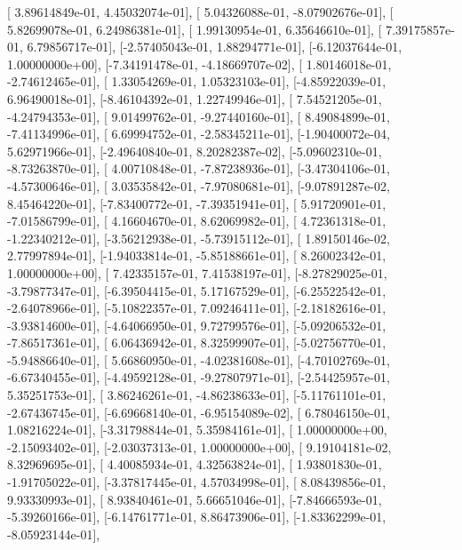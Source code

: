 \documentclass{article}
\begin{document}
       [ 3.89614849e-01,  4.45032074e-01],
       [ 5.04326088e-01, -8.07902676e-01],
       [ 5.82699078e-01,  6.24986381e-01],
       [ 1.99130954e-01,  6.35646610e-01],
       [ 7.39175857e-01,  6.79856717e-01],
       [-2.57405043e-01,  1.88294771e-01],
       [-6.12037644e-01,  1.00000000e+00],
       [-7.34191478e-01, -4.18669707e-02],
       [ 1.80146018e-01, -2.74612465e-01],
       [ 1.33054269e-01,  1.05323103e-01],
       [-4.85922039e-01,  6.96490018e-01],
       [-8.46104392e-01,  1.22749946e-01],
       [ 7.54521205e-01, -4.24794353e-01],
       [ 9.01499762e-01, -9.27440160e-01],
       [ 8.49084899e-01, -7.41134996e-01],
       [ 6.69994752e-01, -2.58345211e-01],
       [-1.90400072e-04,  5.62971966e-01],
       [-2.49640840e-01,  8.20282387e-02],
       [-5.09602310e-01, -8.73263870e-01],
       [ 4.00710848e-01, -7.87238936e-01],
       [-3.47304106e-01, -4.57300646e-01],
       [ 3.03535842e-01, -7.97080681e-01],
       [-9.07891287e-02,  8.45464220e-01],
       [-7.83400772e-01, -7.39351941e-01],
       [ 5.91720901e-01, -7.01586799e-01],
       [ 4.16604670e-01,  8.62069982e-01],
       [ 4.72361318e-01, -1.22340212e-01],
       [-3.56212938e-01, -5.73915112e-01],
       [ 1.89150146e-02,  2.77997894e-01],
       [-1.94033814e-01, -5.85188661e-01],
       [ 8.26002342e-01,  1.00000000e+00],
       [ 7.42335157e-01,  7.41538197e-01],
       [-8.27829025e-01, -3.79877347e-01],
       [-6.39504415e-01,  5.17167529e-01],
       [-6.25522542e-01, -2.64078966e-01],
       [-5.10822357e-01,  7.09246411e-01],
       [-2.18182616e-01, -3.93814600e-01],
       [-4.64066950e-01,  9.72799576e-01],
       [-5.09206532e-01, -7.86517361e-01],
       [ 6.06436942e-01,  8.32599907e-01],
       [-5.02756770e-01, -5.94886640e-01],
       [ 5.66860950e-01, -4.02381608e-01],
       [-4.70102769e-01, -6.67340455e-01],
       [-4.49592128e-01, -9.27807971e-01],
       [-2.54425957e-01,  5.35251753e-01],
       [ 3.86246261e-01, -4.86238633e-01],
       [-5.11761101e-01, -2.67436745e-01],
       [-6.69668140e-01, -6.95154089e-02],
       [ 6.78046150e-01,  1.08216224e-01],
       [-3.31798844e-01,  5.35984161e-01],
       [ 1.00000000e+00, -2.15093402e-01],
       [-2.03037313e-01,  1.00000000e+00],
       [ 9.19104181e-02,  8.32969695e-01],
       [ 4.40085934e-01,  4.32563824e-01],
       [ 1.93801830e-01, -1.91705022e-01],
       [-3.37817445e-01,  4.57034998e-01],
       [ 8.08439856e-01,  9.93330993e-01],
       [ 8.93840461e-01,  5.66651046e-01],
       [-7.84666593e-01, -5.39260166e-01],
       [-6.14761771e-01,  8.86473906e-01],
       [-1.83362299e-01, -8.05923144e-01],
\end{document}
